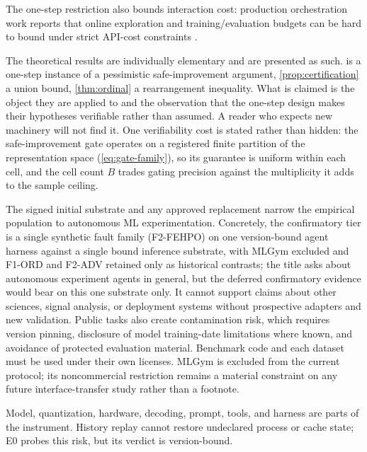 The one-step restriction also bounds interaction cost: production orchestration
work reports that online exploration and training/evaluation budgets can be
hard to bound under strict API-cost constraints \citep{gstar2026}.

The theoretical results are individually elementary and are presented as such.
 is a one-step instance of a pessimistic safe-improvement
argument, \cref{prop:certification} a union bound, \cref{thm:ordinal} a
rearrangement inequality.  What is claimed is the object they are applied to and
the observation that the one-step design makes their hypotheses verifiable
rather than assumed.  A reader who expects new machinery will not find it.
One verifiability cost is stated rather than hidden: the safe-improvement gate
operates on a registered finite partition of the representation space
(\cref{eq:gate-family}), so its guarantee is uniform within each cell, and the
cell count $B$ trades gating precision against the multiplicity it adds to the
sample ceiling.

The signed initial substrate and any approved replacement narrow the empirical
population to autonomous ML experimentation.  Concretely, the confirmatory tier
is a single synthetic fault family (F2-FEHPO) on one version-bound agent harness
against a single bound inference substrate, with MLGym excluded and F1-ORD and F2-ADV retained only
as historical contrasts; the title asks about autonomous experiment agents in
general, but the deferred confirmatory evidence would bear on this one
substrate only.  It cannot support claims about other sciences,
signal analysis, or deployment systems without prospective adapters and new
validation.  Public tasks also create contamination risk, which requires
version pinning, disclosure of model training-date limitations where known, and
avoidance of protected evaluation material.  Benchmark code and each dataset
must be used under their own licenses.  MLGym is excluded from the current
protocol; its noncommercial restriction remains a material constraint on any
future interface-transfer study rather than a footnote.

Model, quantization, hardware, decoding, prompt, tools, and harness are parts of
the instrument.  History replay cannot restore undeclared process or cache
state; E0 probes this risk, but its verdict is version-bound.


